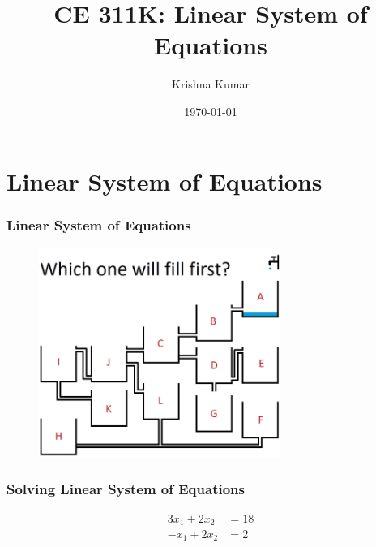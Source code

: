 \documentclass[notes]{beamer}
\title[CE 311K: Linear Systems]{CE 311K: Linear System of Equations}
\author{Krishna Kumar} %
\institute[UT Austin] %
{
University of Texas at Austin \\
\medskip
\href{mailto:krishnak@utexas.edu}{krishnak@utexas.edu} %
}
\date{\today} %
\begin{document}
\begin{frame}
\titlepage %
\end{frame}

\newif\ifshowtoc
\showtoctrue%

\AtBeginSection{%
	\ifshowtoc
	\begin{frame}
		\tableofcontents[currentsection, subsectionstyle=show/show/hide]
	\end{frame}
	\fi
}


\section{Linear System of Equations}
\begin{frame}
	\frametitle{Linear System of Equations}
	\begin{figure}[ht]
		\centering
		\includegraphics[width=0.7\textwidth]{figs/fluid-flow.png}
	\end{figure}
\end{frame}

\begin{frame}
	\frametitle{Solving Linear System of Equations}
	\begin{align*}
		3 x_1 + 2 x_2 & = 18 \\
		-x_1 + 2 x_2 & = 2
	\end{align*}
\end{frame}
\end{document}
